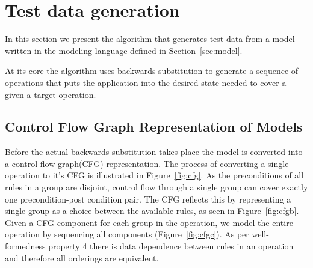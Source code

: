 \section{Test data generation}

In this section we present the algorithm that generates test data
from a model written in the modeling language defined in
Section~\ref{sec:model}. 

At its core the algorithm uses backwards substitution to generate a
sequence of operations that puts the application into the desired
state needed to cover a given a target operation. 

\subsection{Control Flow Graph Representation of Models}
\label{sec:control-flow-graph}

Before the actual backwards substitution takes place the model is
converted into a control flow graph(CFG) representation. The process of
converting a single operation to it's CFG is
illustrated in Figure~\ref{fig:cfg}. As the preconditions of all rules in
a group are disjoint, control flow through a single group can cover
exactly one precondition-post condition pair. The CFG reflects this by
representing a single group as a choice between the available rules, as
seen in Figure~\ref{fig:cfgb}. Given a CFG component for each group in
the operation, we model the entire operation by sequencing all
components (Figure~\ref{fig:cfgc}). As per well-formedness property 4
there is data dependence between rules in an operation and therefore
all orderings are equivalent.

